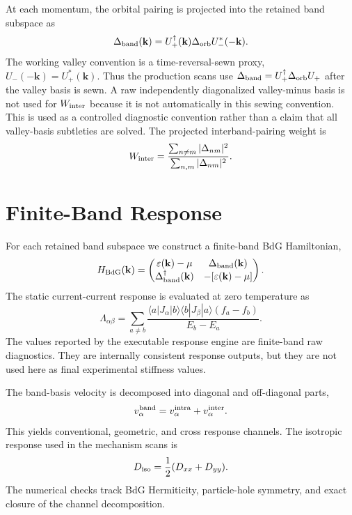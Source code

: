 \documentclass[aps,prb,reprint,superscriptaddress,floatfix,nofootinbib]{revtex4-2}
\begin{document}
At each momentum, the orbital pairing is projected into the retained band
subspace as
\begin{equation}
  \Delta_{\rm band}(\mathbf{k})
  =
  U_+^\dagger(\mathbf{k})
  \Delta_{\rm orb}
  U_-^*(-\mathbf{k}).
\end{equation}
The working valley convention is a time-reversal-sewn proxy,
$U_{-}(-\mathbf{k})=U_{+}^*(\mathbf{k})$.
Thus the production scans use
$\Delta_{\rm band}=U_+^\dagger\Delta_{\rm orb}U_+$ after the valley basis is
sewn.  A raw independently diagonalized valley-minus basis is not used for
$W_{\rm inter}$ because it is not automatically in this sewing convention.
This is used as a controlled diagnostic convention rather than a claim that all
valley-basis subtleties are solved.
The projected interband-pairing weight is
\begin{equation}
  W_{\rm inter}
  =
  \frac{\sum_{n\ne m}|\Delta_{nm}|^2}
       {\sum_{n,m}|\Delta_{nm}|^2}.
\end{equation}

\section{Finite-Band Response}

For each retained band subspace we construct a finite-band BdG Hamiltonian,
\begin{equation}
  H_{\rm BdG}(\mathbf{k}) =
  \begin{pmatrix}
  \varepsilon(\mathbf{k})-\mu & \Delta_{\rm band}(\mathbf{k})\\
  \Delta^\dagger_{\rm band}(\mathbf{k}) & -[\varepsilon(\mathbf{k})-\mu]
  \end{pmatrix}.
\end{equation}
The static current-current response is evaluated at zero temperature as
\begin{equation}
  \Lambda_{\alpha\beta}
  =
  \sum_{a\ne b}
  \frac{
  \langle a|J_\alpha|b\rangle
  \langle b|J_\beta|a\rangle
  (f_a-f_b)}
  {E_b-E_a}.
  \label{eq:kubo}
\end{equation}
The values reported by the executable response engine are finite-band raw
diagnostics.  They are internally consistent response outputs, but they are not
used here as final experimental stiffness values.

The band-basis velocity is decomposed into diagonal and off-diagonal parts,
\begin{equation}
  v_\alpha^{\rm band}
  =
  v_\alpha^{\rm intra}+v_\alpha^{\rm inter}.
\end{equation}
This yields conventional, geometric, and cross response channels.  The
isotropic response used in the mechanism scans is
\begin{equation}
  D_{\rm iso}=\frac{1}{2}(D_{xx}+D_{yy}).
\end{equation}
The numerical checks track BdG Hermiticity, particle-hole symmetry, and exact
closure of the channel decomposition.
\end{document}

